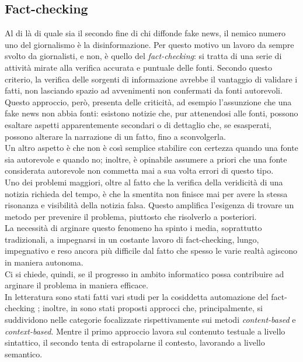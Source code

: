 \documentclass[12pt]{report}
\theoremstyle{definition}
\begin{document}
\subsection{Fact-checking} \label{factchecking}
Al di là di quale sia il secondo fine di chi diffonde fake news, il nemico numero uno del giornalismo è la disinformazione.
Per questo motivo un lavoro da sempre svolto da giornalisti, e non, è quello del \textit{fact-checking}: si tratta di una serie di attività mirate alla verifica accurata e puntuale delle fonti.
Secondo questo criterio, la verifica delle sorgenti di informazione avrebbe il vantaggio di validare i fatti, non lasciando spazio ad avvenimenti non confermati da fonti autorevoli.
Questo approccio, però, presenta delle criticità, ad esempio l'assunzione che una fake news non abbia fonti: esistono notizie che, pur attenendosi alle fonti, possono esaltare aspetti apparentemente secondari o di dettaglio che, se esasperati, possono alterare la narrazione di un fatto, fino a sconvolgerla.
\\
Un altro aspetto è che non è così semplice stabilire con certezza quando una fonte sia autorevole e quando no; inoltre, è opinabile assumere a priori che una fonte considerata autorevole non commetta mai a sua volta errori di questo tipo.
\\
Uno dei problemi maggiori, oltre al fatto che la verifica della veridicità di una notizia richieda del tempo, è che la smentita non finisce mai per avere la stessa risonanza e visibilità della notizia falsa. Questo amplifica l'esigenza di trovare un metodo per prevenire il problema, piuttosto che risolverlo a posteriori.
\\
La necessità di arginare questo fenomeno ha spinto i media, soprattutto tradizionali, a impegnarsi in un costante lavoro di fact-checking, lungo, impegnativo e reso ancora più difficile dal fatto che spesso le varie realtà agiscono in maniera autonoma.
\\
Ci si chiede, quindi, se il progresso in ambito informatico possa contribuire ad arginare il problema in maniera efficace.
\\
In letteratura sono stati fatti vari studi per la cosiddetta automazione del fact-checking \cite{5, 6, 8, 9, 10, 11}; inoltre, in \cite{15, 16, 21} sono stati proposti approcci che, principalmente, si suddividono nelle categorie focalizzate rispettivamente sui metodi \textit{content-based} e \textit{context-based}.
Mentre il primo approccio lavora sul contenuto testuale a livello sintattico, il secondo tenta di estrapolarne il contesto, lavorando a livello semantico.
\end{document}
